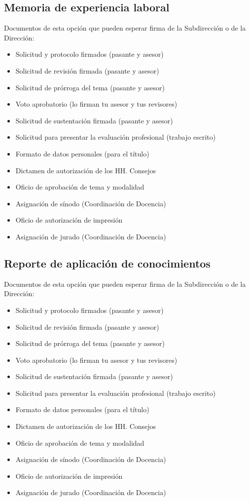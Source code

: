 \subsection{Memoria de experiencia laboral}
Documentos de esta opción que pueden esperar firma de la Subdirección o de la Dirección:
\begin{itemize}
  \item Solicitud y protocolo firmados (pasante y asesor)
  \item Solicitud de revisión firmada (pasante y asesor)
  \item Solicitud de prórroga del tema (pasante y asesor)
  \item Voto aprobatorio (lo firman tu asesor y tus revisores)
  \item Solicitud de sustentación firmada (pasante y asesor)
  \item Solicitud para presentar la evaluación profesional (trabajo escrito)
  \item Formato de datos personales (para el título)
  \item Dictamen de autorización de los HH. Consejos
  \item Oficio de aprobación de tema y modalidad
  \item Asignación de sínodo (Coordinación de Docencia)
  \item Oficio de autorización de impresión
  \item Asignación de jurado (Coordinación de Docencia)
\end{itemize}
\subsection{Reporte de aplicación de conocimientos}
Documentos de esta opción que pueden esperar firma de la Subdirección o de la Dirección:
\begin{itemize}
  \item Solicitud y protocolo firmados (pasante y asesor)
  \item Solicitud de revisión firmada (pasante y asesor)
  \item Solicitud de prórroga del tema (pasante y asesor)
  \item Voto aprobatorio (lo firman tu asesor y tus revisores)
  \item Solicitud de sustentación firmada (pasante y asesor)
  \item Solicitud para presentar la evaluación profesional (trabajo escrito)
  \item Formato de datos personales (para el título)
  \item Dictamen de autorización de los HH. Consejos
  \item Oficio de aprobación de tema y modalidad
  \item Asignación de sínodo (Coordinación de Docencia)
  \item Oficio de autorización de impresión
  \item Asignación de jurado (Coordinación de Docencia)
\end{itemize}

